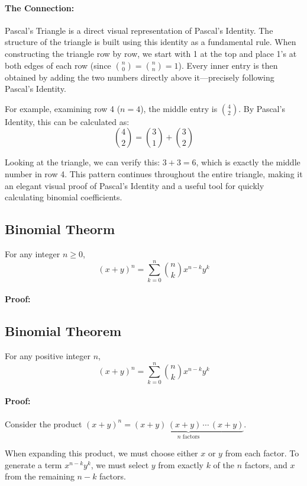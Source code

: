 \paragraph{The Connection:}
Pascal's Triangle is a direct visual representation of Pascal's Identity. The structure of the triangle is built using this identity as a fundamental rule. When constructing the triangle row by row, we start with 1 at the top and place 1's at both edges of each row (since $\binom{n}{0} = \binom{n}{n} = 1$). Every inner entry is then obtained by adding the two numbers directly above it—precisely following Pascal's Identity.

For example, examining row 4 ($n = 4$), the middle entry is $\binom{4}{2}$. By Pascal's Identity, this can be calculated as:
\[ \binom{4}{2} = \binom{3}{1} + \binom{3}{2} \]

Looking at the triangle, we can verify this: $3 + 3 = 6$, which is exactly the middle number in row 4. This pattern continues throughout the entire triangle, making it an elegant visual proof of Pascal's Identity and a useful tool for quickly calculating binomial coefficients.


\subsection{Binomial Theorm}
\begin{theorembox}[title=Binomial Theorem]
    For any integer \(n \geq 0\),
    \[
    (x + y)^n = \sum_{k=0}^{n} \binom{n}{k} x^{n-k} y^k
    \]
\end{theorembox}
\paragraph{Proof:}

\subsection{Binomial Theorem}
\begin{theorembox}[title=Binomial Theorem]
    For any positive integer \(n\),
    \[
    (x+y)^n = \sum_{k=0}^{n} \binom{n}{k} x^{n-k} y^k
    \]
\end{theorembox}
\paragraph{Proof:} Consider the product $(x+y)^n = \underbrace{(x+y)\,(x+y)\,\cdots\,(x+y)}_{\text{$n$ factors}}$.

When expanding this product, we must choose either $x$ or $y$ from each factor. To generate a term $x^{n-k}y^k$, we must select $y$ from exactly $k$ of the $n$ factors, and $x$ from the remaining $n-k$ factors.

